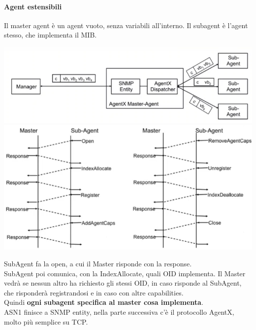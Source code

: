 \documentclass[10pt]{book}
\begin{document}
\paragraph{Agent estensibili} Il master agent è un agent vuoto, senza variabili all'interno. Il subagent è l'agent stesso, che implementa il MIB.
\begin{center}
	\includegraphics[scale=0.75]{snmp3agentestensibili.png}\\
	\includegraphics[scale=0.6]{snmp3agentestensibili2.png}
\end{center}
SubAgent fa la open, a cui il Master risponde con la response.\\SubAgent poi comunica, con la IndexAllocate, quali OID implementa. Il Master vedrà se nessun altro ha richiesto gli stessi OID, in caso risponde al SubAgent, che risponderà registrandosi e in caso con altre capabilities.\\
Quindi \textbf{ogni subagent specifica al master cosa implementa}.\\
ASN1 finisce a SNMP entity, nella parte successiva c'è il protocollo AgentX, molto più semplice su TCP.
\end{document}
